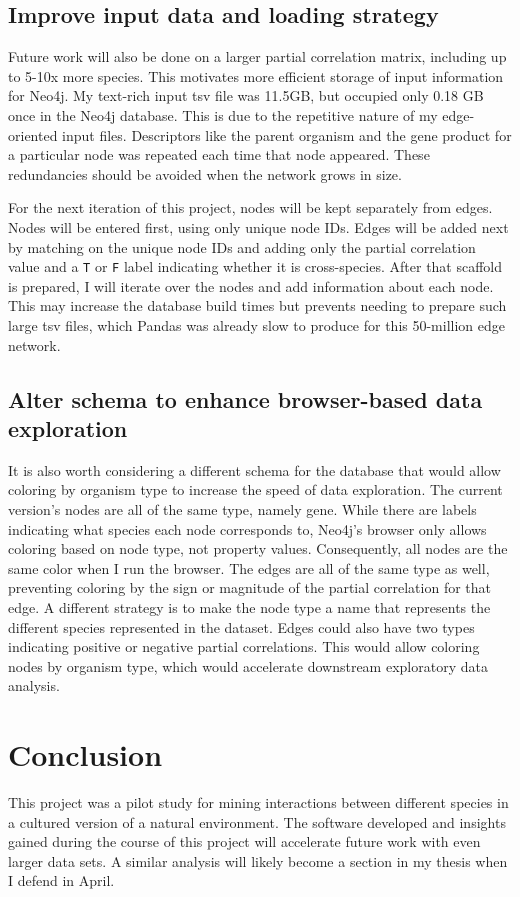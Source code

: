 \documentclass[12pt]{article}
\begin{document}
\subsection{Improve input data and loading strategy}
Future work will also be done on a larger partial correlation matrix, including up to 5-10x more species.  
This motivates more efficient storage of input information for Neo4j. 
My text-rich input tsv file was 11.5GB, but occupied only 0.18 GB  once in the Neo4j database.
This is due to the repetitive nature of my edge-oriented input files. 
Descriptors like the parent organism and the gene product for a particular node was repeated each time that node appeared.
These redundancies should be avoided when the network grows in size. 

For the next iteration of this project, nodes will be kept separately from edges.
Nodes will be entered first, using only unique node IDs.
Edges will be added next by matching on the unique node IDs and adding only the partial correlation value and a \texttt{T} or \texttt{F} label indicating whether it is cross-species.
After that scaffold is prepared, I will iterate over the nodes and add information about each node.  
This may increase the database build times but prevents needing to prepare such large tsv files, which Pandas was already slow to produce for this 50-million edge network.

\subsection{Alter schema to enhance browser-based data exploration}
It is also worth considering a different schema for the database that would allow coloring by organism type to increase the speed of data exploration. 
The current version's nodes are all of the same type, namely gene.  
While there are labels indicating what species each node corresponds to, Neo4j's browser only allows coloring based on node type, not property values.
Consequently, all nodes are the same color when I run the browser.  
The edges are all of the same type as well, preventing coloring by the sign or magnitude of the partial correlation for that edge. 
A different strategy is to make the node type a name that represents the different species represented in the dataset.
Edges could also have two types indicating positive or negative partial correlations. 
This would allow coloring nodes by organism type, which would accelerate downstream exploratory data analysis. 

\section{Conclusion}
This project was a pilot study for mining interactions between different species in a cultured version of a natural environment.
The software developed and insights gained during the course of this project will accelerate future work with even larger data sets. 
A similar analysis will likely become a section in my thesis when I defend in April. 



 
 
\end{document}
